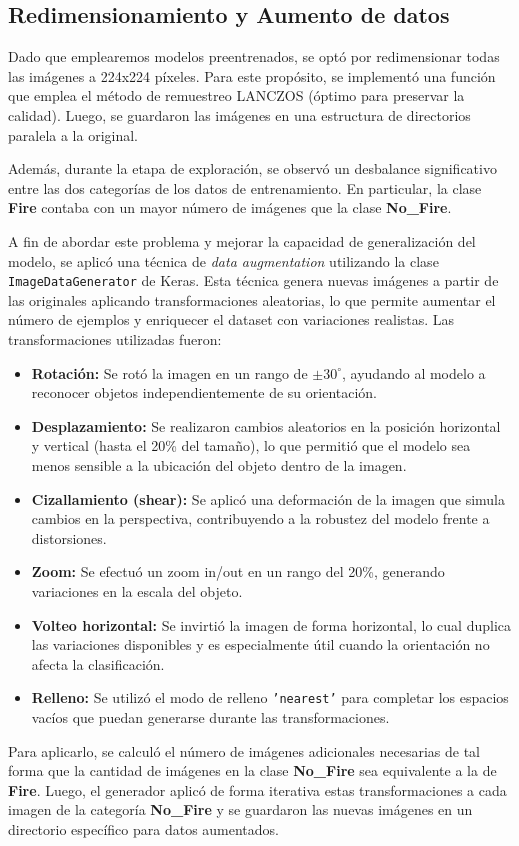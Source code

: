 \subsection{Redimensionamiento y Aumento de datos}
Dado que emplearemos modelos preentrenados, se optó por redimensionar todas las imágenes 
a 224x224 píxeles. Para este propósito, se implementó una función que emplea 
el método de remuestreo LANCZOS (óptimo para preservar la calidad). Luego, se guardaron las imágenes
en una estructura de directorios paralela a la original.

Además, durante la etapa de exploración, se observó un desbalance significativo entre las 
dos categorías de los datos de entrenamiento. En particular, la clase \textbf{Fire} contaba con un mayor número 
de imágenes que la clase \textbf{No\_Fire}. 

A fin de abordar este problema y mejorar la capacidad de generalización del modelo, 
se aplicó una técnica de \emph{data augmentation} utilizando la clase \texttt{ImageDataGenerator} de Keras. 
Esta técnica genera nuevas imágenes a partir de las originales aplicando transformaciones aleatorias, 
lo que permite aumentar el número de ejemplos y enriquecer el dataset con variaciones realistas. 
Las transformaciones utilizadas fueron:

\begin{itemize}
    \item \textbf{Rotación:} Se rotó la imagen en un rango de $\pm30^\circ$, ayudando al modelo a 
    reconocer objetos independientemente de su orientación.
    \item \textbf{Desplazamiento:} Se realizaron cambios aleatorios en la posición horizontal y 
    vertical (hasta el 20\% del tamaño), lo que permitió que el modelo sea menos sensible a la 
    ubicación del objeto dentro de la imagen.
    \item \textbf{Cizallamiento (shear):} Se aplicó una deformación de la imagen que simula cambios en la perspectiva, 
    contribuyendo a la robustez del modelo frente a distorsiones.
    \item \textbf{Zoom:} Se efectuó un zoom in/out en un rango del 20\%, generando variaciones en la escala del objeto.
    \item \textbf{Volteo horizontal:} Se invirtió la imagen de forma horizontal, lo cual duplica 
    las variaciones disponibles y es especialmente útil cuando la orientación no afecta la clasificación.
    \item \textbf{Relleno:} Se utilizó el modo de relleno \texttt{'nearest'} para completar los espacios 
    vacíos que puedan generarse durante las transformaciones.
\end{itemize}

Para aplicarlo, se calculó el número de imágenes adicionales necesarias de tal forma que la cantidad de 
imágenes en la clase \textbf{No\_Fire} sea equivalente a la de \textbf{Fire}. Luego, 
el generador aplicó de forma iterativa estas transformaciones a cada imagen de la categoría \textbf{No\_Fire} y se 
guardaron las nuevas imágenes en un directorio específico para datos aumentados.





